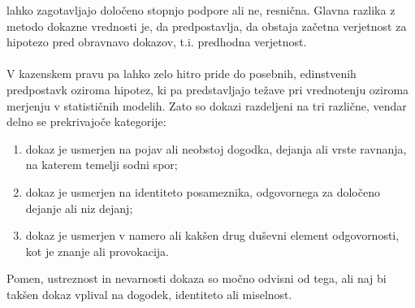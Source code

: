 \documentclass[12pt,a4paper]{amsart}
\theoremstyle{definition} %
\theoremstyle{plain} %
\begin{document}
lahko zagotavljajo določeno stopnjo podpore ali ne, resnična. Glavna razlika z metodo dokazne vrednosti je, da predpostavlja, da obstaja začetna 
verjetnost za hipotezo pred obravnavo dokazov, t.i. predhodna verjetnost.\\\\
V kazenskem pravu pa lahko zelo hitro pride do posebnih, edinstvenih predpostavk oziroma hipotez, ki pa predstavljajo težave pri vrednotenju oziroma 
merjenju v statističnih modelih. Zato so dokazi razdeljeni na tri različne, vendar delno se prekrivajoče kategorije:
\begin{enumerate}
    \item dokaz je usmerjen na pojav ali neobstoj dogodka, dejanja ali vrste ravnanja, na katerem temelji sodni spor;
    \item dokaz je usmerjen na identiteto posameznika, odgovornega za določeno dejanje ali niz dejanj;
    \item dokaz je usmerjen v namero ali kakšen drug duševni element odgovornosti, kot je znanje ali provokacija.
\end{enumerate}
Pomen, ustreznost in nevarnosti dokaza so močno odvisni od tega, ali naj bi takšen dokaz vplival na dogodek, identiteto ali miselnost.

\end{document}
